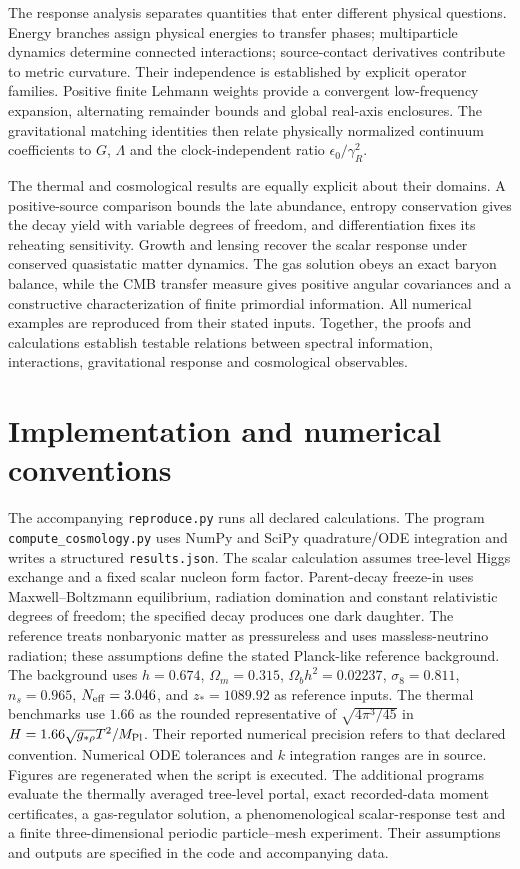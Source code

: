 \documentclass[11pt,a4paper]{article}
\numberwithin{equation}{section}
\newcommand{\Om}{\Omega}
\begin{document}
The response analysis separates quantities that enter different physical questions. Energy branches assign physical energies to transfer phases; multiparticle dynamics determine connected interactions; source-contact derivatives contribute to metric curvature. Their independence is established by explicit operator families. Positive finite Lehmann weights provide a convergent low-frequency expansion, alternating remainder bounds and global real-axis enclosures. The gravitational matching identities then relate physically normalized continuum coefficients to $G$, $\Lambda$ and the clock-independent ratio $\epsilon_0/\gamma_R^2$.

The thermal and cosmological results are equally explicit about their domains. A positive-source comparison bounds the late abundance, entropy conservation gives the decay yield with variable degrees of freedom, and differentiation fixes its reheating sensitivity. Growth and lensing recover the scalar response under conserved quasistatic matter dynamics. The gas solution obeys an exact baryon balance, while the CMB transfer measure gives positive angular covariances and a constructive characterization of finite primordial information. All numerical examples are reproduced from their stated inputs. Together, the proofs and calculations establish testable relations between spectral information, interactions, gravitational response and cosmological observables.
\appendix
\section{Implementation and numerical conventions}

The accompanying \texttt{reproduce.py} runs all declared calculations. The program \texttt{compute\_\allowbreak{}cosmology.py} uses NumPy and SciPy quadrature/ODE integration and writes a structured \texttt{results.json}. The scalar calculation assumes tree-level Higgs exchange and a fixed scalar nucleon form factor. Parent-decay freeze-in uses Maxwell--Boltzmann equilibrium, radiation domination and constant relativistic degrees of freedom; the specified decay produces one dark daughter. The reference treats nonbaryonic matter as pressureless and uses massless-neutrino radiation; these assumptions define the stated Planck-like reference background. The background uses $h=0.674$, $\Om_m=0.315$, $\Om_bh^2=0.02237$, $\sigma_8=0.811$, $n_s=0.965$, $N_{\rm eff}=3.046$, and $z_*=1089.92$ as reference inputs. The thermal benchmarks use $1.66$ as the rounded representative of $\sqrt{4\pi^3/45}$ in $H=1.66\sqrt{g_{*\rho}}T^2/M_{\rm Pl}$. Their reported numerical precision refers to that declared convention. Numerical ODE tolerances and $k$ integration ranges are in source. Figures are regenerated when the script is executed. The additional programs evaluate the thermally averaged tree-level portal, exact recorded-data moment certificates, a gas-regulator solution, a phenomenological scalar-response test and a finite three-dimensional periodic particle--mesh experiment. Their assumptions and outputs are specified in the code and accompanying data.
\end{document}
